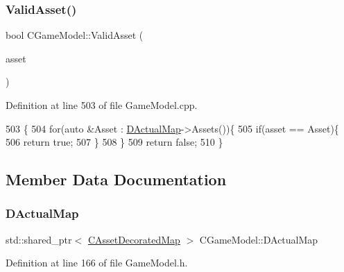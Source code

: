 \subsubsection{\texorpdfstring{Valid\+Asset()}{ValidAsset()}}
{\footnotesize\ttfamily bool C\+Game\+Model\+::\+Valid\+Asset (\begin{DoxyParamCaption}\item[{std\+::shared\+\_\+ptr$<$ \hyperlink{classCPlayerAsset}{C\+Player\+Asset} $>$}]{asset }\end{DoxyParamCaption})}



Definition at line 503 of file Game\+Model.\+cpp.


\begin{DoxyCode}
503                                                               \{
504     \textcolor{keywordflow}{for}(\textcolor{keyword}{auto} &Asset : \hyperlink{classCGameModel_ace04c3b62d6b71e20d1ed5460c0c3cee}{DActualMap}->Assets())\{
505         \textcolor{keywordflow}{if}(asset == Asset)\{
506             \textcolor{keywordflow}{return} \textcolor{keyword}{true};    
507         \}
508     \}
509     \textcolor{keywordflow}{return} \textcolor{keyword}{false};
510 \}
\end{DoxyCode}


\subsection{Member Data Documentation}
\hypertarget{classCGameModel_ace04c3b62d6b71e20d1ed5460c0c3cee}{}\label{classCGameModel_ace04c3b62d6b71e20d1ed5460c0c3cee} 
\subsubsection{\texorpdfstring{D\+Actual\+Map}{DActualMap}}
{\footnotesize\ttfamily std\+::shared\+\_\+ptr$<$ \hyperlink{classCAssetDecoratedMap}{C\+Asset\+Decorated\+Map} $>$ C\+Game\+Model\+::\+D\+Actual\+Map\hspace{0.3cm}{\ttfamily [protected]}}



Definition at line 166 of file Game\+Model.\+h.

\hypertarget{classCGameModel_a2207654c461a3654c6d765dd5421373f}{}\label{classCGameModel_a2207654c461a3654c6d765dd5421373f} 
